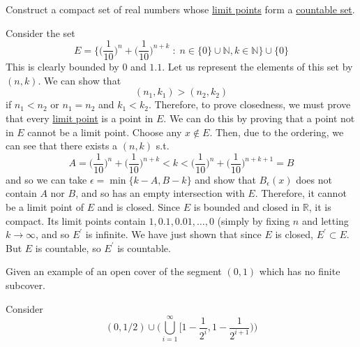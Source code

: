   \begin{exercise}[Rudin 2.13]
    Construct a compact set of real numbers whose \hyperref[pst-def:limit-point]{limit points} form a \hyperref[st-def:countable]{countable set}. 
  \end{exercise}
  \begin{solution}
    Consider the set 
    \begin{equation}
      E = \bigg\{ \bigg( \frac{1}{10}\bigg)^n + \bigg( \frac{1}{10} \bigg)^{n+k} \; : \; n \in \{0\} \cup \mathbb{N}, k \in \mathbb{N} \bigg\} \cup \{0\}
    \end{equation}
    This is clearly bounded by $0$ and $1.1$. Let us represent the elements of this set by $(n, k)$. We can show that 
    \begin{equation}
      (n_1, k_1) > (n_2, k_2)
    \end{equation}
    if $n_1 < n_2$ or $n_1 = n_2$ and $k_1 < k_2$. Therefore, to prove closedness, we must prove that every \hyperref[pst-def:limit-point]{limit point} is a point in $E$. We can do this by proving that a point not in $E$ cannot be a limit point. Choose any $x \not\in E$. Then, due to the ordering, we can see that there exists a $(n, k)$ s.t. 
    \begin{equation}
      A = \bigg( \frac{1}{10}\bigg)^n + \bigg( \frac{1}{10} \bigg)^{n+k} < k < \bigg( \frac{1}{10}\bigg)^n + \bigg( \frac{1}{10} \bigg)^{n+k+1} = B
    \end{equation}
    and so we can take $\epsilon = \min\{k - A, B - k\}$ and show that $B_\epsilon (x)$ does not contain $A$ nor $B$, and so has an empty intersection with $E$. Therefore, it cannot be a limit point of $E$ and is closed. Since $E$ is bounded and closed in $\mathbb{R}$, it is compact. Its limit points contain $1, 0.1, 0.01, \ldots, 0$ (simply by fixing $n$ and letting $k \rightarrow \infty$, and so $E^\prime$ is infinite. We have just shown that since $E$ is closed, $E^\prime \subset E$. But $E$ is countable, so $E^\prime$ is countable. 
  \end{solution}

  \begin{exercise}[Rudin 2.14]
    Given an example of an open cover of the segment $(0, 1)$ which has no finite subcover. 
  \end{exercise}
  \begin{solution}
    Consider 
    \begin{equation}
      (0, 1/2) \cup \bigg( \bigcup_{i=1}^\infty \Big[ 1 - \frac{1}{2^i}, 1 - \frac{1}{2^{i+1}} \Big) \bigg)
    \end{equation}
  \end{solution}

